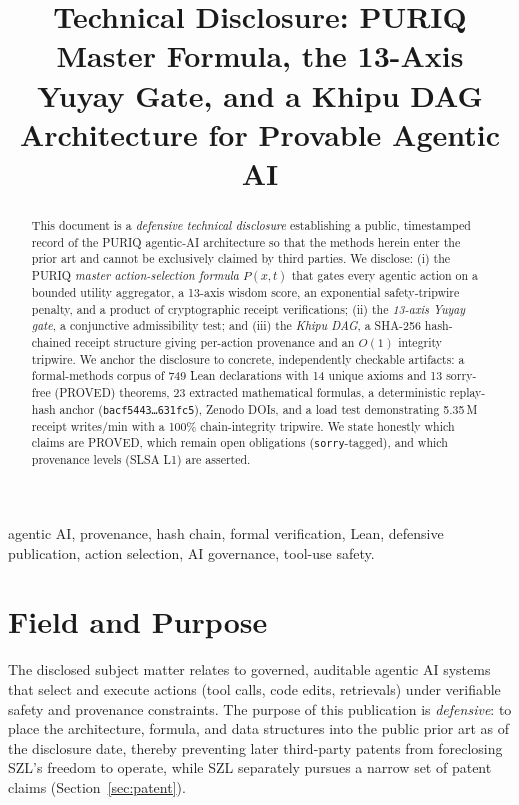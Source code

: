 \documentclass[10pt,conference]{IEEEtran}
\begin{document}
\title{Technical Disclosure: PURIQ Master Formula, the 13-Axis Yuyay Gate, and a
Khipu DAG Architecture for Provable Agentic AI}

\author{
}

\maketitle

\begin{abstract}
This document is a \emph{defensive technical disclosure} establishing a public,
timestamped record of the PURIQ agentic-AI architecture so that the methods herein
enter the prior art and cannot be exclusively claimed by third parties. We disclose:
(i) the PURIQ \emph{master action-selection formula} $P(x,t)$ that gates every agentic
action on a bounded utility aggregator, a 13-axis wisdom score, an exponential
safety-tripwire penalty, and a product of cryptographic receipt verifications;
(ii) the \emph{13-axis Yuyay gate}, a conjunctive admissibility test; and (iii) the
\emph{Khipu DAG}, a SHA-256 hash-chained receipt structure giving per-action provenance
and an $O(1)$ integrity tripwire. We anchor the disclosure to concrete, independently
checkable artifacts: a formal-methods corpus of 749 Lean declarations with 14 unique
axioms and 13 sorry-free (PROVED) theorems, 23 extracted mathematical formulas, a
deterministic replay-hash anchor (\texttt{bacf5443\ldots631fc5}), Zenodo DOIs, and a
load test demonstrating 5.35\,M receipt writes/min with a 100\% chain-integrity
tripwire. We state honestly which claims are PROVED, which remain open obligations
(\texttt{sorry}-tagged), and which provenance levels (SLSA L1) are asserted.
\end{abstract}

\begin{IEEEkeywords}
agentic AI, provenance, hash chain, formal verification, Lean, defensive publication,
action selection, AI governance, tool-use safety.
\end{IEEEkeywords}

\section{Field and Purpose}
The disclosed subject matter relates to governed, auditable agentic AI systems that
select and execute actions (tool calls, code edits, retrievals) under verifiable safety
and provenance constraints. The purpose of this publication is \emph{defensive}: to place
the architecture, formula, and data structures into the public prior art as of the
disclosure date, thereby preventing later third-party patents from foreclosing SZL's
freedom to operate, while SZL separately pursues a narrow set of patent claims
(Section~\ref{sec:patent}).
\end{document}
